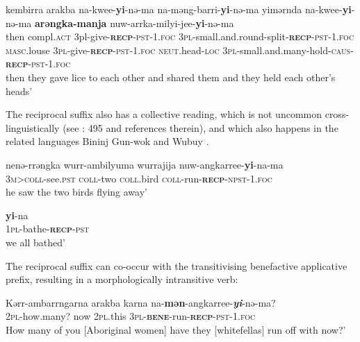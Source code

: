 \documentclass[output=paper]{langscibook}
\begin{document}
\ea%
 \label{ex:vanegmond:15}
 \gll kembirra arakba na-kwee-\textbf{yi}{-nə-ma} na-məng-barri-\textbf{yi}-nə-ma yimərnda na-kwee-\textbf{{yi}}{-nə-ma} \textbf{arəngka-manja} {nuw-arrka-milyi-jee-}\textbf{{yi}}{-nə-ma}\\
then compl.\textsc{act} 3pl-give-\textbf{\textsc{recp}}-\textsc{pst}-1.\textsc{foc} \textsc{3pl}-small.and.round-split-\textbf{\textsc{recp}}-\textsc{pst}-1.\textsc{foc} \textsc{masc}.louse \textsc{3pl-}give-\textbf{\textsc{recp}}-\textsc{pst}-1.\textsc{foc} \textsc{neut}.head-\textsc{loc} \textsc{3pl}-small.and.many-hold-\textsc{caus}-\textbf{\textsc{recp}}-\textsc{pst}-1.\textsc{foc}\\
\glt then they gave lice to each other and shared them and they held each other’s heads’
\z



The reciprocal suffix also has a collective reading, which is not uncommon cross-linguistically (see \citealt{Evans2003}: 495 and references therein), and which also happens in the related languages Bininj Gun-wok \citep{Evans2003} and Wubuy \citep{Heath1984}.



\ea%
 \label{ex:vanegmond:16}

 \ea
 \label{ex:vanegmond:16a}
\gll nenə-rrəngka wurr-ambilyuma wurrajija nuw-angkarree-\textbf{yi}{-na-ma}\\
\textsc{3m>}\textsc{coll}-see.\textsc{pst} \textsc{coll}-two \textsc{coll}.bird \textsc{coll}-run-\textbf{\textsc{recp}}-\textsc{npst}-1.\textsc{foc}\\
\glt he saw the two birds flying away’ \citep[448]{Leeding1989}



 \ex
 \label{ex:vanegmond:16b}
\textbf{{yi}}{-na}\\
\textsc{1pl}-bathe-\textbf{\textsc{recp}}-\textsc{pst}\\
\glt we all bathed’
\z
\z



The reciprocal suffix can co-occur with the transitivising benefactive applicative prefix, resulting in a morphologically intransitive verb:



\ea%
 \label{ex:vanegmond:17}
\gll Kərr-ambarrngarna arakba karna na-\textbf{{mən}}{-angkarree-}\textbf{\textit{yi}}{-nə-ma?}\\
\textsc{2pl}-how.many? now \textsc{2pl}.this \textsc{3pl}-\textbf{\textsc{bene}}-run-\textbf{\textsc{recp}}-\textsc{pst}-1.\textsc{foc}\\
\glt How many of you [Aboriginal women] have they [whitefellas] run off with now?’
\z
\end{document}
